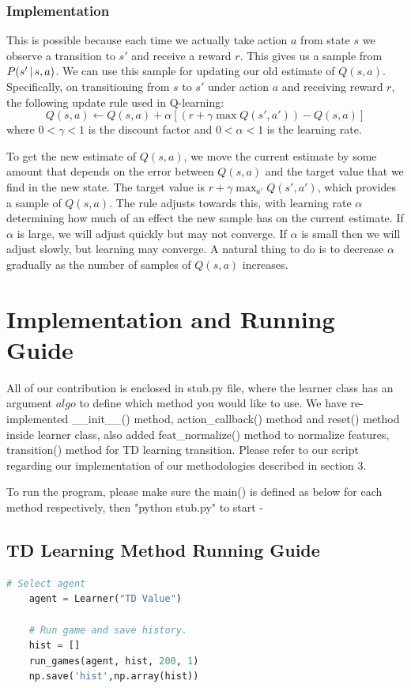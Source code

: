 \documentclass[submit]{harvardml}
\begin{document}
\subsubsection{Implementation}
This is possible because each time we actually take action $a$ from state $s$ we observe a transition to $s'$ and receive a reward $r$. This gives us a sample from $P(s' \,|\, s, a)$. We can use this sample for updating our old estimate of $Q(s, a)$. Specifically, on transitioning from $s$ to $s'$ under action $a$ and receiving reward $r$, the following update rule used in Q-learning:
$$ Q(s,a) \leftarrow Q(s,a) + \alpha \left[ (r + \gamma \max Q(s',a')) - Q(s,a) \right] $$
where $0<\gamma<1$ is the discount factor and $0<\alpha<1$ is the learning rate.

To get the new estimate of $Q(s, a)$, we move the current estimate by some amount that depends on the error between $Q(s, a)$ and the target value that we find in the new state. The target value is $r + \gamma \max_{a'} Q(s', a')$, which provides a sample of $Q(s, a)$. The rule adjusts towards this, with learning rate $\alpha$ determining how much of an effect the new sample has on the current estimate. If $\alpha$ is large, we will adjust quickly but may not converge. If $\alpha$ is small then we will adjust slowly, but learning may converge. A natural thing to do is to decrease $\alpha$ gradually as the number of samples of $Q(s, a)$ increases.

\section{Implementation and Running Guide}

All of our contribution is enclosed in stub.py file, where the learner class has an argument $algo$ to define which method you would like to use. We have re-implemented \_\_init\_\_() method, action\_callback() method and reset() method inside learner class, also added feat\_normalize() method to normalize features, transition() method for TD learning transition. Please refer to our script regarding our implementation of our methodologies described in section 3.

To run the program, please make sure the main() is defined as below for each method respectively, then "python stub.py" to start - 

\subsection{TD Learning Method Running Guide}
\begin{lstlisting}[language=python]
    # Select agent
    agent = Learner("TD Value")

    # Run game and save history.
    hist = []
    run_games(agent, hist, 200, 1)
    np.save('hist',np.array(hist))
\end{lstlisting}
\end{document}
